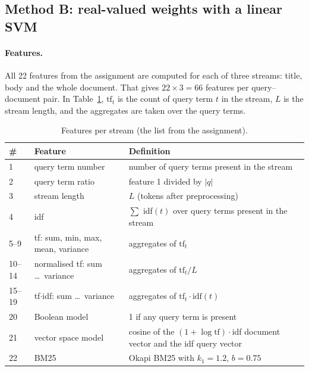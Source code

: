 \documentclass[11pt,a4paper]{article}
\begin{document}
\subsection{Method B: real-valued weights with a linear SVM}

\paragraph{Features.} All 22 features from the assignment are computed for each of three
streams: title, body and the whole document. That gives $22 \times 3 = 66$ features per
query--document pair. In Table~\ref{tab:features}, $\text{tf}_t$ is the count of query term
$t$ in the stream, $L$ is the stream length, and the aggregates are taken over the query
terms.

\begin{table}[H]
\centering
\small
\begin{tabularx}{\linewidth}{llX}
\toprule
\textbf{\#} & \textbf{Feature} & \textbf{Definition} \\
\midrule
1      & query term number                 & number of query terms present in the stream \\
2      & query term ratio                  & feature 1 divided by $|q|$ \\
3      & stream length                     & $L$ (tokens after preprocessing) \\
4      & idf                               & $\sum$ idf$(t)$ over query terms present in the stream \\
5--9   & tf: sum, min, max, mean, variance & aggregates of $\text{tf}_t$ \\
10--14 & normalised tf: sum \dots\ variance & aggregates of $\text{tf}_t / L$ \\
15--19 & tf$\cdot$idf: sum \dots\ variance & aggregates of $\text{tf}_t \cdot \text{idf}(t)$ \\
20     & Boolean model                     & 1 if any query term is present \\
21     & vector space model                & cosine of the $(1+\log \text{tf})\cdot$idf document vector and the idf query vector \\
22     & BM25                              & Okapi BM25 with $k_1 = 1.2$, $b = 0.75$ \\
\bottomrule
\end{tabularx}
\caption{Features per stream (the list from the assignment).}
\label{tab:features}
\end{table}
\end{document}
